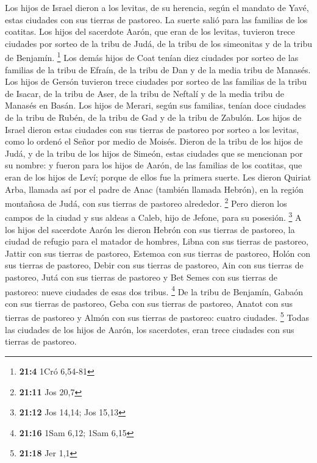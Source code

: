  Los hijos de Israel dieron a los levitas, de su herencia,
según el mandato de Yavé, estas ciudades con sus tierras de pastoreo.
 La suerte salió para las familias de los coatitas. Los
hijos del sacerdote Aarón, que eran de los levitas, tuvieron trece
ciudades por sorteo de la tribu de Judá, de la tribu de los simeonitas y
de la tribu de Benjamín. \footnote{\textbf{21:4} 1Cró 6,54-81}
 Los demás hijos de Coat tenían diez ciudades por sorteo
de las familias de la tribu de Efraín, de la tribu de Dan y de la media
tribu de Manasés.  Los hijos de Gersón tuvieron trece
ciudades por sorteo de las familias de la tribu de Isacar, de la tribu
de Aser, de la tribu de Neftalí y de la media tribu de Manasés en Basán.
 Los hijos de Merari, según sus familias, tenían doce
ciudades de la tribu de Rubén, de la tribu de Gad y de la tribu de
Zabulón.  Los hijos de Israel dieron estas ciudades con
sus tierras de pastoreo por sorteo a los levitas, como lo ordenó el
Señor por medio de Moisés.  Dieron de la tribu de los
hijos de Judá, y de la tribu de los hijos de Simeón, estas ciudades que
se mencionan por su nombre:  y fueron para los hijos de
Aarón, de las familias de los coatitas, que eran de los hijos de Leví;
porque de ellos fue la primera suerte.  Les dieron
Quiriat Arba, llamada así por el padre de Anac (también llamada Hebrón),
en la región montañosa de Judá, con sus tierras de pastoreo alrededor.
\footnote{\textbf{21:11} Jos 20,7}  Pero dieron los
campos de la ciudad y sus aldeas a Caleb, hijo de Jefone, para su
posesión. \footnote{\textbf{21:12} Jos 14,14; Jos 15,13} 
A los hijos del sacerdote Aarón les dieron Hebrón con sus tierras de
pastoreo, la ciudad de refugio para el matador de hombres, Libna con sus
tierras de pastoreo,  Jattir con sus tierras de pastoreo,
Estemoa con sus tierras de pastoreo,  Holón con sus
tierras de pastoreo, Debir con sus tierras de pastoreo, 
Ain con sus tierras de pastoreo, Jutá con sus tierras de pastoreo y Bet
Semes con sus tierras de pastoreo: nueve ciudades de esas dos tribus.
\footnote{\textbf{21:16} 1Sam 6,12; 1Sam 6,15}  De la
tribu de Benjamín, Gabaón con sus tierras de pastoreo, Geba con sus
tierras de pastoreo,  Anatot con sus tierras de pastoreo
y Almón con sus tierras de pastoreo: cuatro ciudades. \footnote{\textbf{21:18}
  Jer 1,1}  Todas las ciudades de los hijos de Aarón, los
sacerdotes, eran trece ciudades con sus tierras de pastoreo.

